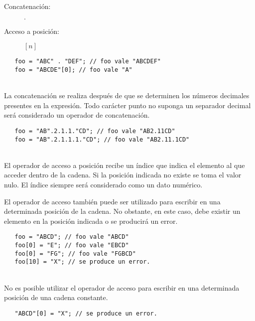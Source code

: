 \begin{description}
\item [Concatenación:] $.$
\item [Acceso a posición:] $[n]$
\end{description} 

\begin{lstlisting}
   foo = "ABC" . "DEF"; // foo vale "ABCDEF"
   foo = "ABCDE"[0]; // foo vale "A"
\end{lstlisting} 
\hfill\\

La concatenación se realiza después de que se determinen los números decimales presentes en la 
expresión. Todo carácter punto no suponga un separador decimal será considerado un operador
de concatenación.\\  

\begin{lstlisting}
   foo = "AB".2.1.1."CD"; // foo vale "AB2.11CD"
   foo = "AB".2.1.1.1."CD"; // foo vale "AB2.11.1CD"
\end{lstlisting} 
\hfill\\

El operador de acceso a posición recibe un índice que indica el elemento al que acceder dentro de la 
cadena. Si la posición indicada no existe se toma el valor nulo. El índice siempre será considerado como un 
dato numérico.

El operador de acceso también puede ser utilizado para escribir en una determinada posición de la cadena.
No obstante, en este caso, debe existir un elemento en la posición indicada o se producirá un error. \\

\begin{lstlisting}
   foo = "ABCD"; // foo vale "ABCD"
   foo[0] = "E"; // foo vale "EBCD"
   foo[0] = "FG"; // foo vale "FGBCD"
   foo[10] = "X"; // se produce un error.
\end{lstlisting} 
\hfill\\

No es posible utilizar el operador de acceso para escribir en una determinada posición de una cadena constante. \\

\begin{lstlisting}
   "ABCD"[0] = "X"; // se produce un error.
\end{lstlisting} 
\hfill\\

